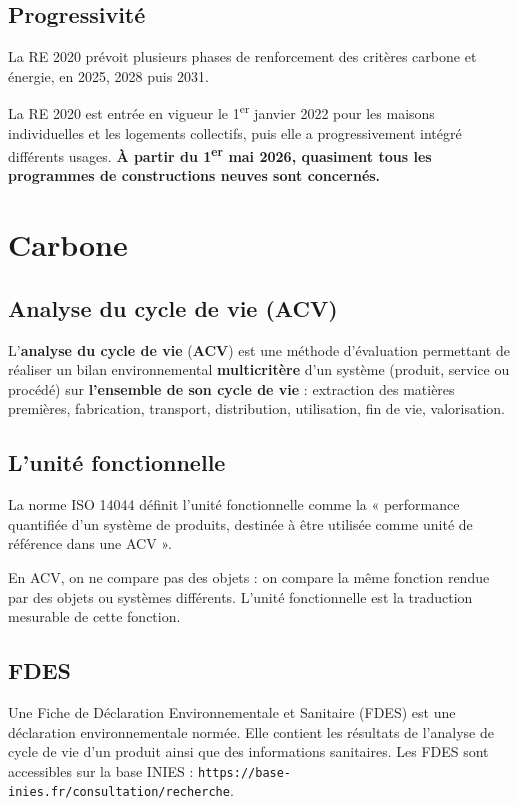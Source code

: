 \subsection*{Progressivité}
La RE 2020 prévoit plusieurs phases de renforcement des critères carbone et énergie, en 2025, 2028 puis 2031.

La RE 2020 est entrée en vigueur le 1\textsuperscript{er} janvier 2022 pour les maisons individuelles et les logements collectifs, puis elle a progressivement intégré différents usages.
\textbf{À partir du 1\textsuperscript{er} mai 2026, quasiment tous les programmes de constructions neuves sont concernés.} 

\section{Carbone}

\subsection*{Analyse du cycle de vie (ACV)}
L'\textbf{analyse du cycle de vie} (\textbf{ACV}) est une méthode d'évaluation permettant de réaliser un bilan environnemental \textbf{multicritère} d'un système (produit, service ou procédé) sur \textbf{l'ensemble de son cycle de vie} : extraction des matières premières, fabrication, transport, distribution, utilisation, fin de vie, valorisation.

\subsection*{L'unité fonctionnelle}
La norme ISO 14044 définit l'unité fonctionnelle comme la « performance quantifiée d'un système de produits, destinée à être utilisée comme unité de référence dans une ACV ».

En ACV, on ne compare pas des objets : on compare la même fonction rendue par des objets ou systèmes différents. L'unité fonctionnelle est la traduction mesurable de cette fonction.

\subsection*{FDES}
Une Fiche de Déclaration Environnementale et Sanitaire (FDES) est une déclaration environnementale normée. Elle contient les résultats de l'analyse de cycle de vie d'un produit ainsi que des informations sanitaires.
Les FDES sont accessibles sur la base INIES : \texttt{https://base-inies.fr/consultation/recherche}.

